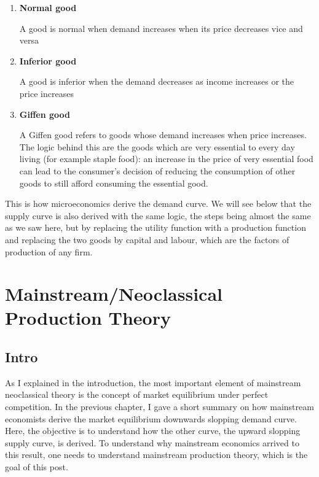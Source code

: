 \documentclass[
  letterpaper,
  DIV=11,
  numbers=noendperiod]{scrreprt}
\begin{document}
\begin{enumerate}
\def\labelenumi{\arabic{enumi}.}
\item
  \textbf{Normal good}

  A good is normal when demand increases when its price decreases vice
  and versa
\item
  \textbf{Inferior good}

  A good is inferior when the demand decreases as income increases or
  the price increases
\item
  \textbf{Giffen good}

  A Giffen good refers to goods whose demand increases when price
  increases. The logic behind this are the goods which are very
  essential to every day living (for example staple food): an increase
  in the price of very essential food can lead to the consumer's
  decision of reducing the consumption of other goods to still afford
  consuming the essential good.
\end{enumerate}

This is how microeconomics derive the demand curve. We will see below
that the supply curve is also derived with the same logic, the steps
being almost the same as we saw here, but by replacing the utility
function with a production function and replacing the two goods by
capital and labour, which are the factors of production of any firm.

\hypertarget{mainstreamneoclassical-production-theory}{%
\chapter{Mainstream/Neoclassical Production
Theory}\label{mainstreamneoclassical-production-theory}}

\hypertarget{intro}{%
\section{Intro}\label{intro}}

As I explained in the introduction, the most important element of
mainstream neoclassical theory is the concept of market equilibrium
under perfect competition. In the previous chapter, I gave a short
summary on how mainstream economists derive the market equilibrium
downwards slopping demand curve. Here, the objective is to understand
how the other curve, the upward slopping supply curve, is derived. To
understand why mainstream economics arrived to this result, one needs to
understand mainstream production theory, which is the goal of this post.
\end{document}
